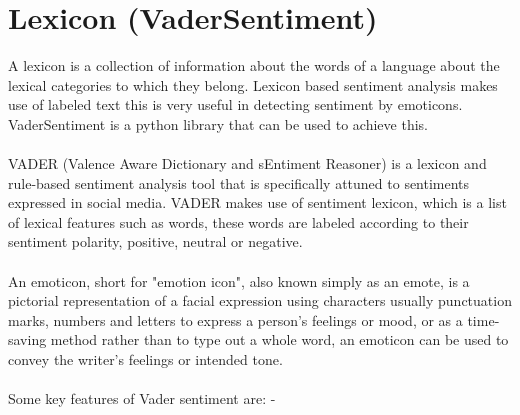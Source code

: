 \section{Lexicon (VaderSentiment)}
A lexicon is a collection of information about the words of a language about the lexical categories to which they belong. Lexicon based sentiment analysis makes use of labeled text this is very useful in detecting sentiment by emoticons. 
%
VaderSentiment is a python library that can be used to achieve this.\\ \\
VADER (Valence Aware Dictionary and sEntiment Reasoner) is a lexicon and rule-based sentiment analysis tool that is specifically attuned to sentiments expressed in social media.
VADER makes use of sentiment lexicon, which is a list of lexical features such as words, these words are labeled according to their sentiment polarity, positive, neutral or negative.
 \\ \\
An emoticon, short for "emotion icon", also known simply as an emote, is a pictorial representation of a facial expression using characters usually punctuation marks, numbers and letters to express a person's feelings or mood, or as a time-saving method rather than to type out a whole word, an emoticon can be used to convey the writer's feelings or intended tone. \\ \\

Some key features of Vader sentiment are: -


